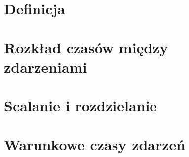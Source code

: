 \section{Definicja}


\newpage
\section{Rozkład czasów między zdarzeniami}


\newpage
\section{Scalanie i rozdzielanie}


\newpage
\section{Warunkowe czasy zdarzeń}
